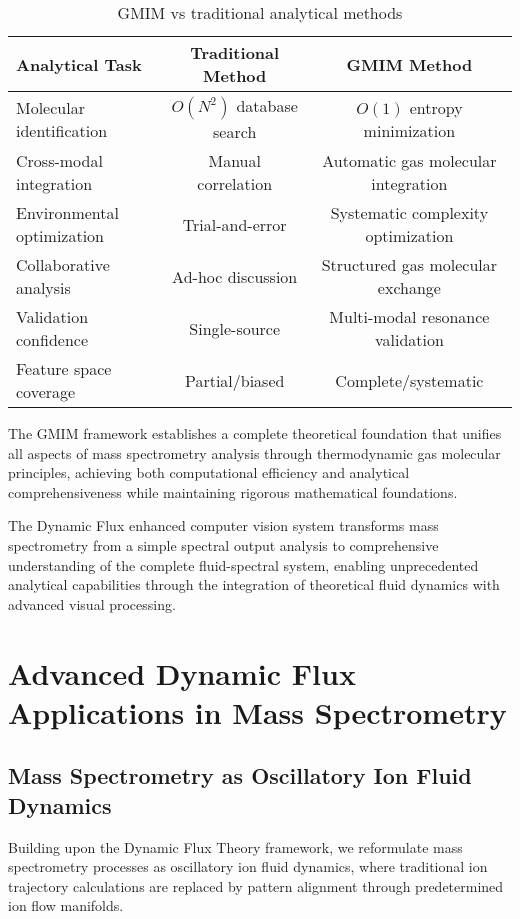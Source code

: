 \documentclass[11pt,a4paper]{article}
\theoremstyle{remark}
\begin{document}
\begin{table}[H]
\centering
\begin{tabular}{lcc}
\toprule
Analytical Task & Traditional Method & GMIM Method \\
\midrule
Molecular identification & $O(N^2)$ database search & $O(1)$ entropy minimization \\
Cross-modal integration & Manual correlation & Automatic gas molecular integration \\
Environmental optimization & Trial-and-error & Systematic complexity optimization \\
Collaborative analysis & Ad-hoc discussion & Structured gas molecular exchange \\
Validation confidence & Single-source & Multi-modal resonance validation \\
Feature space coverage & Partial/biased & Complete/systematic \\
\bottomrule
\end{tabular}
\caption{GMIM vs traditional analytical methods}
\end{table}

The GMIM framework establishes a complete theoretical foundation that unifies all aspects of mass spectrometry analysis through thermodynamic gas molecular principles, achieving both computational efficiency and analytical comprehensiveness while maintaining rigorous mathematical foundations.

The Dynamic Flux enhanced computer vision system transforms mass spectrometry from a simple spectral output analysis to comprehensive understanding of the complete fluid-spectral system, enabling unprecedented analytical capabilities through the integration of theoretical fluid dynamics with advanced visual processing.

\section{Advanced Dynamic Flux Applications in Mass Spectrometry}

\subsection{Mass Spectrometry as Oscillatory Ion Fluid Dynamics}

Building upon the Dynamic Flux Theory framework, we reformulate mass spectrometry processes as oscillatory ion fluid dynamics, where traditional ion trajectory calculations are replaced by pattern alignment through predetermined ion flow manifolds.
\end{document}

